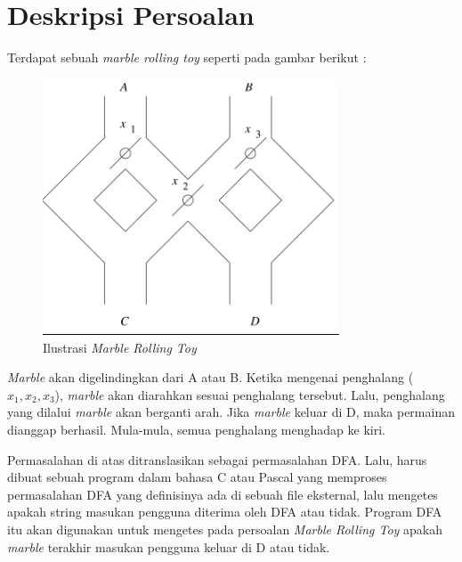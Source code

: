 \section{Deskripsi Persoalan}
Terdapat sebuah \textit{marble rolling toy} seperti pada gambar berikut :
\begin{figure}[h!]
  \centering
  \includegraphics[width=250pt]{gambar.png}
  \caption{Ilustrasi \textit{Marble Rolling Toy}}
\end{figure}

\textit{Marble} akan digelindingkan dari A atau B. Ketika mengenai penghalang ($x_1, x_2, x_3$), \textit{marble} akan diarahkan sesuai penghalang tersebut. Lalu, penghalang yang dilalui \textit{marble} akan berganti arah. Jika \textit{marble} keluar di D, maka permainan dianggap berhasil. Mula-mula, semua penghalang menghadap ke kiri.

Permasalahan di atas ditranslasikan sebagai permasalahan DFA. Lalu, harus dibuat sebuah program dalam bahasa C atau Pascal yang memproses permasalahan DFA yang definisinya ada di sebuah file eksternal, lalu mengetes apakah string masukan pengguna diterima oleh DFA atau tidak. Program DFA itu akan digunakan untuk mengetes pada persoalan \textit{Marble Rolling Toy} apakah \textit{marble} terakhir masukan pengguna keluar di D atau tidak.
